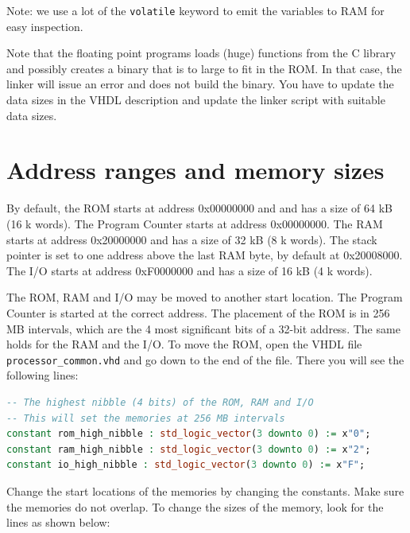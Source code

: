 \documentclass[12pt]{article}
\begin{document}
Note: we use a lot of the \texttt{volatile} keyword to emit the variables to RAM for easy inspection.

Note that the floating point programs loads (huge) functions from the C library and possibly creates a binary that is to large to fit in the ROM. In that case, the linker will issue an error and does not build the binary. You have to update the data sizes in the VHDL description and update the linker script with suitable data sizes.

\section{Address ranges and memory sizes}
By default, the ROM starts at address 0x00000000 and and has a size of 64 kB (16 k words). The Program Counter starts at address 0x00000000. The RAM starts at address 0x20000000 and has a size of 32 kB (8 k words). The stack pointer is set to one address above the last RAM byte, by default at 0x20008000. The I/O starts at address 0xF0000000 and has a size of 16 kB (4 k words).

The ROM, RAM and I/O may be moved to another start location. The Program Counter is started at the correct address. The placement of the ROM is in 256 MB intervals, which are the 4 most significant bits of a 32-bit address. The same holds for the RAM and the I/O. To move the ROM, open the VHDL file \lstinline|processor_common.vhd| and go down to the end of the file. There you will see the following lines:

\begin{lstlisting}[language=VHDL]
-- The highest nibble (4 bits) of the ROM, RAM and I/O
-- This will set the memories at 256 MB intervals
constant rom_high_nibble : std_logic_vector(3 downto 0) := x"0";
constant ram_high_nibble : std_logic_vector(3 downto 0) := x"2";
constant io_high_nibble : std_logic_vector(3 downto 0) := x"F";
\end{lstlisting}

Change the start locations of the memories by changing the constants. Make sure the memories do not overlap. To change the sizes of the memory, look for the lines as shown below:
\end{document}
